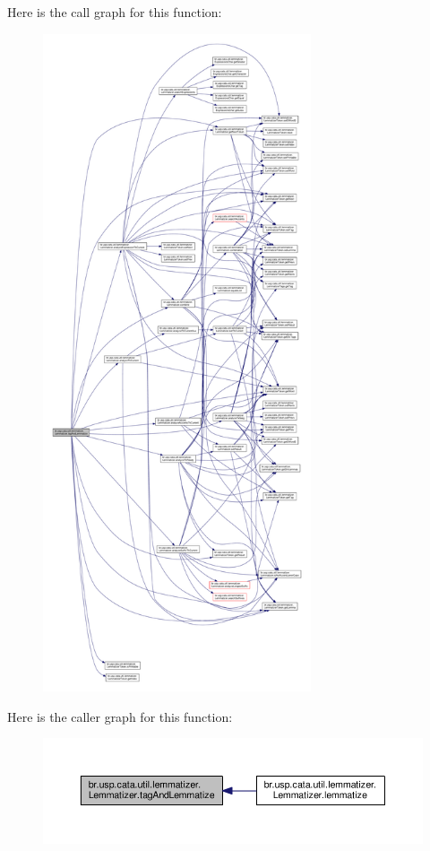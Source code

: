 Here is the call graph for this function\+:\nopagebreak
\begin{figure}[H]
\begin{center}
\leavevmode
\includegraphics[height=550pt]{classbr_1_1usp_1_1cata_1_1util_1_1lemmatizer_1_1_lemmatizer_aa5df3e813c815846be9df216bf8a310c_cgraph}
\end{center}
\end{figure}




Here is the caller graph for this function\+:\nopagebreak
\begin{figure}[H]
\begin{center}
\leavevmode
\includegraphics[width=350pt]{classbr_1_1usp_1_1cata_1_1util_1_1lemmatizer_1_1_lemmatizer_aa5df3e813c815846be9df216bf8a310c_icgraph}
\end{center}
\end{figure}


